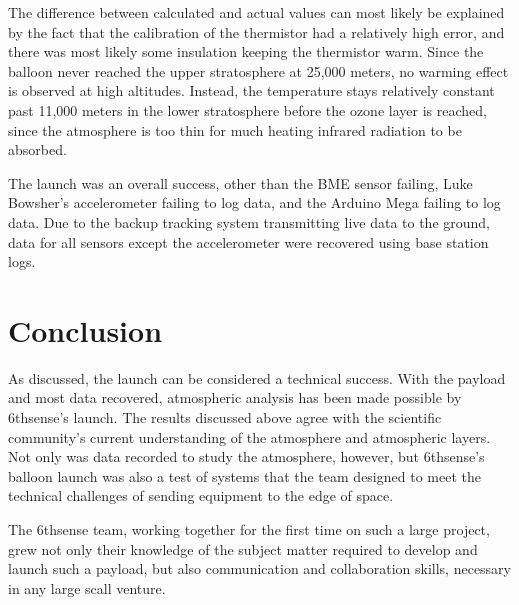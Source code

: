 \documentclass[12pt,]{article}
\begin{document}
The difference between calculated and actual values can most likely be
explained by the fact that the calibration of the thermistor had a
relatively high error, and there was most likely some insulation keeping
the thermistor warm. Since the balloon never reached the upper
stratosphere at 25,000 meters, no warming effect is observed at high
altitudes. Instead, the temperature stays relatively constant past
11,000 meters in the lower stratosphere before the ozone layer is
reached, since the atmosphere is too thin for much heating infrared
radiation to be absorbed.

The launch was an overall success, other than the BME sensor failing,
Luke Bowsher's accelerometer failing to log data, and the Arduino Mega
failing to log data. Due to the backup tracking system transmitting live
data to the ground, data for all sensors except the accelerometer were
recovered using base station logs.

\section{Conclusion}\label{conclusion}

As discussed, the launch can be considered a technical success. With the
payload and most data recovered, atmospheric analysis has been made
possible by 6thsense's launch. The results discussed above agree with
the scientific community's current understanding of the atmosphere and
atmospheric layers. Not only was data recorded to study the atmosphere,
however, but 6thsense's balloon launch was also a test of systems that
the team designed to meet the technical challenges of sending equipment
to the edge of space.

The 6thsense team, working together for the first time on such a large
project, grew not only their knowledge of the subject matter required to
develop and launch such a payload, but also communication and
collaboration skills, necessary in any large scall venture.
\end{document}
